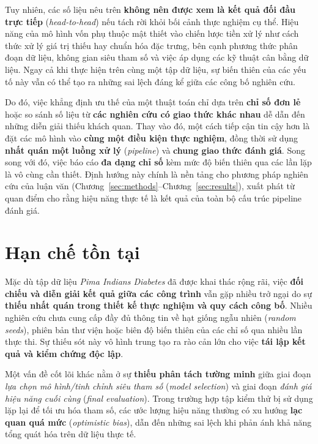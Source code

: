 \documentclass[14pt,a4paper]{extreport}
\begin{document}
Tuy nhiên, các số liệu nêu trên \textbf{không nên được xem là kết quả đối đầu trực tiếp} (\textit{head-to-head}) nếu tách rời khỏi bối cảnh thực nghiệm cụ thể. Hiệu năng của mô hình vốn phụ thuộc mật thiết vào chiến lược tiền xử lý như cách thức xử lý giá trị thiếu hay chuẩn hóa đặc trưng, bên cạnh phương thức phân đoạn dữ liệu, không gian siêu tham số và việc áp dụng các kỹ thuật cân bằng dữ liệu.\cite{chang2022pima,pedregosa2011,kirbas2025shap} Ngay cả khi thực hiện trên cùng một tập dữ liệu, sự biến thiên của các yếu tố này vẫn có thể tạo ra những sai lệch đáng kể giữa các công bố nghiên cứu.

Do đó, việc khẳng định ưu thế của một thuật toán chỉ dựa trên \textbf{chỉ số đơn lẻ} hoặc so sánh số liệu từ \textbf{các nghiên cứu có giao thức khác nhau} dễ dẫn đến những diễn giải thiếu khách quan. Thay vào đó, một cách tiếp cận tin cậy hơn là đặt các mô hình vào \textbf{cùng một điều kiện thực nghiệm}, đồng thời sử dụng \textbf{nhất quán một luồng xử lý} (\textit{pipeline}) và \textbf{chung giao thức đánh giá}. Song song với đó, việc báo cáo \textbf{đa dạng chỉ số} kèm mức độ biến thiên qua các lần lặp là vô cùng cần thiết. Định hướng này chính là nền tảng cho phương pháp nghiên cứu của luận văn (Chương~\ref{sec:methods}--Chương~\ref{sec:results}), xuất phát từ quan điểm cho rằng hiệu năng thực tế là kết quả của toàn bộ cấu trúc pipeline đánh giá.\cite{miao2021pima,pedregosa2011}


\section{Hạn chế tồn tại}

Mặc dù tập dữ liệu \emph{Pima Indians Diabetes} đã được khai thác rộng rãi, việc \textbf{đối chiếu và diễn giải kết quả giữa các công trình} vẫn gặp nhiều trở ngại do sự \textbf{thiếu nhất quán trong thiết kế thực nghiệm và quy cách công bố}. Nhiều nghiên cứu chưa cung cấp đầy đủ thông tin về hạt giống ngẫu nhiên (\textit{random seeds}), phiên bản thư viện hoặc biên độ biến thiên của các chỉ số qua nhiều lần thực thi. Sự thiếu sót này vô hình trung tạo ra rào cản lớn cho việc \textbf{tái lập kết quả và kiểm chứng độc lập}.\cite{chang2022pima,pedregosa2011}

Một vấn đề cốt lõi khác nằm ở sự \textbf{thiếu phân tách tường minh} giữa giai đoạn \emph{lựa chọn mô hình/tinh chỉnh siêu tham số} (\textit{model selection}) và giai đoạn \emph{đánh giá hiệu năng cuối cùng} (\textit{final evaluation}). Trong trường hợp tập kiểm thử bị sử dụng lặp lại để tối ưu hóa tham số, các ước lượng hiệu năng thường có xu hướng \textbf{lạc quan quá mức} (\textit{optimistic bias}), dẫn đến những sai lệch khi phản ánh khả năng tổng quát hóa trên dữ liệu thực tế.\cite{pedregosa2011}
\end{document}
